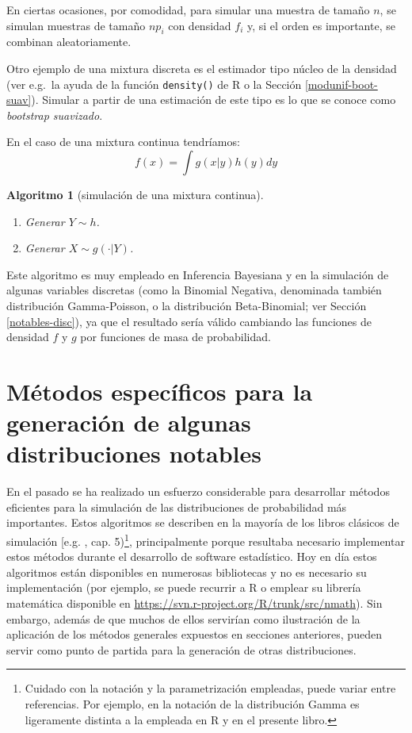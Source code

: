 \documentclass[
  spanish,
  10pt,
]{book}
\theoremstyle{break}
\newtheorem{conjecture}{Algoritmo}[chapter]
\theoremstyle{nonumberplain}
\let\oldfootnote\footnote
\renewcommand\footnote[1]{\oldfootnote{\hspace{2mm}#1}}
\begin{document}
En ciertas ocasiones, por comodidad, para simular una muestra de tamaño \(n\), se simulan muestras de tamaño \(np_{i}\) con densidad \(f_{i}\) y, si el orden es importante, se combinan aleatoriamente.

Otro ejemplo de una mixtura discreta es el estimador tipo núcleo de la densidad (ver e.g.~la ayuda de la función \texttt{density()} de R o la Sección \ref{modunif-boot-suav}).
Simular a partir de una estimación de este tipo es lo que se conoce como \emph{bootstrap suavizado}.

En el caso de una mixtura continua tendríamos:
\[f(x)=\int g(x|y)h(y)dy\]

\begin{conjecture}[simulación de una mixtura continua]
\protect\hypertarget{cnj:mixtura-continua}{}\label{cnj:mixtura-continua}

\begin{enumerate}
\def\labelenumi{\arabic{enumi}.}
\item
  Generar \(Y\sim h\).
\item
  Generar \(X\sim g(\cdot |Y)\).
\end{enumerate}

\end{conjecture}

Este algoritmo es muy empleado en Inferencia Bayesiana y en la simulación de algunas variables discretas (como la Binomial Negativa, denominada también distribución Gamma-Poisson, o la distribución Beta-Binomial; ver Sección \ref{notables-disc}),
ya que el resultado sería válido cambiando las funciones de densidad \(f\) y \(g\) por funciones de masa de probabilidad.

\section{Métodos específicos para la generación de algunas distribuciones notables}\label{notables-cont}

En el pasado se ha realizado un esfuerzo considerable para desarrollar métodos eficientes para la simulación de las distribuciones de probabilidad más importantes.
Estos algoritmos se describen en la mayoría de los libros clásicos de simulación {[}e.g. \citet{cao2002}, cap. 5)\footnote{Cuidado con la notación y la parametrización empleadas, puede variar entre referencias.
  Por ejemplo, en \citet{cao2002} la notación de la distribución Gamma es ligeramente distinta a la empleada en R y en el presente libro.}, principalmente porque resultaba necesario implementar estos métodos durante el desarrollo de software estadístico.
Hoy en día estos algoritmos están disponibles en numerosas bibliotecas y no es necesario su implementación (por ejemplo, se puede recurrir a R o emplear su librería matemática disponible en \url{https://svn.r-project.org/R/trunk/src/nmath}).
Sin embargo, además de que muchos de ellos servirían como ilustración de la aplicación de los métodos generales expuestos en secciones anteriores, pueden servir como punto de partida para la generación de otras distribuciones.
\end{document}
